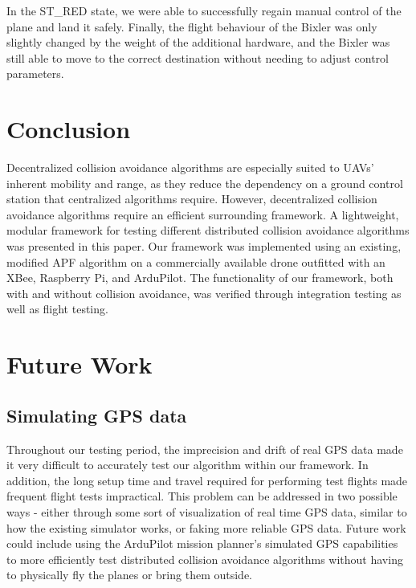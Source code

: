 \documentclass[conference]{IEEEtran}
\begin{document}
In the ST\_RED state, we were able to successfully regain manual control of the plane and land it safely. Finally, the flight behaviour of the Bixler was only slightly changed by the weight of the additional hardware, and the Bixler was still able to move to the correct destination without needing to adjust control parameters.

\section{Conclusion}
\label{sec:conclusion}

Decentralized collision avoidance algorithms are especially suited to UAVs’ inherent mobility and range, as they reduce the dependency on a ground control station that centralized algorithms require. However, decentralized collision avoidance algorithms require an efficient surrounding framework. A lightweight, modular framework for testing different distributed collision avoidance algorithms was presented in this paper. Our framework was implemented using an existing, modified APF algorithm on a commercially available drone outfitted with an XBee, Raspberry Pi, and ArduPilot. The functionality of our framework, both with and without collision avoidance, was verified through integration testing as well as flight testing.

\section{Future Work}
\label{sec:future work}
\subsection{Simulating GPS data}
Throughout our testing period, the imprecision and drift of real GPS data made it very difficult to accurately test our algorithm within our framework. In addition, the long setup time and travel required for performing test flights made frequent flight tests impractical. This problem can be addressed in two possible ways - either through some sort of visualization of real time GPS data, similar to how the existing simulator works, or faking more reliable GPS data. Future work could include using the ArduPilot mission planner’s simulated GPS capabilities to more efficiently test distributed collision avoidance algorithms without having to physically fly the planes or bring them outside. 
\end{document}
